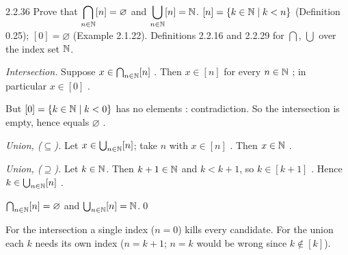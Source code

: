 \begin{bookex}[essential]{2.2.36}
Prove that $\displaystyle\bigcap_{n\in\mathbb{N}}[n]=\varnothing$ and $\displaystyle\bigcup_{n\in\mathbb{N}}[n]=\mathbb{N}$.
\solution
\given $[n]=\{k\in\mathbb{N}\mid k<n\}$ (Definition 0.25); $[0]=\varnothing$ (Example 2.1.22). Definitions 2.2.16 and 2.2.29 for $\bigcap$, $\bigcup$ over the index set $\mathbb{N}$.
\begin{steps}
\item \emph{Intersection.} Suppose $x\in\bigcap_{n\in\mathbb{N}}[n]$ . Then $x\in[n]$ for every $n\in\mathbb{N}$ ; in particular $x\in[0]$ .
\item But $[0]=\{k\in\mathbb{N}\mid k<0\}$ has no elements : contradiction. So the intersection is empty, hence equals $\varnothing$ .
\item \emph{Union, ($\subseteq$).} Let $x\in\bigcup_{n\in\mathbb{N}}[n]$; take $n$ with $x\in[n]$ . Then $x\in\mathbb{N}$ .
\item \emph{Union, ($\supseteq$).} Let $k\in\mathbb{N}$. Then $k+1\in\mathbb{N}$ and $k<k+1$, so $k\in[k+1]$ . Hence $k\in\bigcup_{n\in\mathbb{N}}[n]$ .
\end{steps}
\conclusion $\bigcap_{n\in\mathbb{N}}[n]=\varnothing$ and $\bigcup_{n\in\mathbb{N}}[n]=\mathbb{N}$.\qed
\begin{compare}
\item For the intersection a single index ($n=0$) kills every candidate. For the union each $k$ needs its own index ($n=k+1$; $n=k$ would be wrong since $k\notin[k]$).
\end{compare}
\end{bookex}

